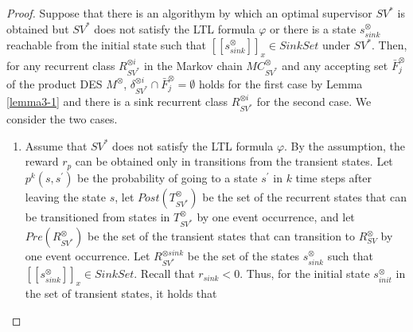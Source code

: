 \documentclass[10pt]{article}
\theoremstyle{definition}
\newcommand{\myspqsink}{\ensuremath{[\![s^{\otimes}_{sink}]\!]}_x}
\begin{document}
\begin{proof}
  Suppose that there is an algorithym by which an optimal supervisor $SV^{\ast}$ is obtained but $SV^{\ast}$ does not satisfy the LTL formula $\varphi$ or there is  a state $s^{\otimes}_{sink}$ reachable from the initial state such that $\myspqsink \in SinkSet$ under $SV^{\ast}$. Then, for any recurrent class $R^{\otimes i}_{{SV}^{\ast}}$ in the Markov chain $MC^{\otimes}_{{SV}^{\ast}}$ and any accepting set $\bar{F}^{\otimes}_j$ of the product DES $M^{\otimes}$,  $\delta^{\otimes i}_{SV^{\ast}} \cap \bar{F}^{\otimes}_j = \emptyset$
  holds for the first case by Lemma \ref{lemma3-1} and there is a sink recurrent class $R^{\otimes i}_{SV^{\ast}}$ for the second case. We consider the two cases.

 \begin{enumerate}
  \item Assume that $SV^{\ast}$ does not satisfy the LTL formula $\varphi$.
  By the assumption, the reward $r_p$ can be obtained only in transitions from the transient states. Let $p^k(s,s^{\prime})$ be the probability of going to a state $s^{\prime}$ in $k$ time steps after leaving the state $s$, let $Post(T^{\otimes}_{SV^{\ast}})$ be the set of the recurrent states that can be transitioned from states in $T^{\otimes}_{SV^{\ast}}$ by one event occurrence, and let $Pre(R^{\otimes}_{SV^{\ast}})$ be the set of the transient states that can transition to $R^{\otimes}_{SV}$ by one event occurrence. Let $R^{\otimes sink}_{SV^{\ast}}$ be the set of the states $s^{\otimes}_{sink}$ such that $\myspqsink \in SinkSet$. Recall that $r_{sink} < 0$. Thus, for the initial state $s^{\otimes}_{init}$ in the set of transient states, it holds that


\end{enumerate}
\end{proof}
\end{document}
